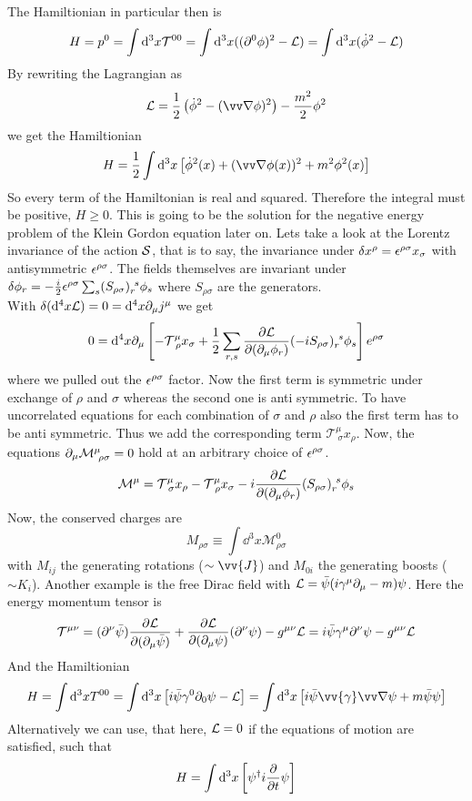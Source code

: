 The Hamiltionian in particular then is
\[ H = p ^0 = \int {\rm d}^3 x \mathcal{T}^{00} = \int {\rm d}^3 x ( (\partial^0 \phi)^2 - \mathcal{L} ) = \int {\rm d}^3 x ( \dot{\phi}^2 - \mathcal{L})\]
By rewriting the Lagrangian as
\[ \LL = \frac{1}{2} \left( \dot{\phi}^2 - ( \vn \phi)^2 \right) - \frac{m^2}{2} \phi^2\]
we get the Hamiltionian
\[ H = \frac{1}{2} \int \dd ^3 x \left[ \dot{\phi}^2(x) + ( \vn \phi(x))^2 + m^2 \phi^2(x) \right]\]
So every term of the Hamiltonian is real and squared. Therefore the integral must be positive, $H \geq 0$. This is going to be the solution for the negative energy problem of the Klein Gordon equation later on.
Lets take a look at the Lorentz invariance of the action $\mathcal{S}$, that is to say, the invariance under $ \delta x^\rho = \epsilon^{\rho \sigma}x_\sigma$ with antisymmetric $\epsilon^{\rho\sigma}$. The fields themselves are invariant under $\delta \phi_r = - \frac{i}{2} \epsilon^{\rho \sigma} \sum_s (S_{\rho\sigma})_r^{~s}\phi_s$ where $S_{\rho\sigma}$ are the generators.\\
With $\delta({\rm d}^4 x \mathcal{L}) = 0 = {\rm d}^4 x \partial_\mu j^\mu$ we get
\[ 0 = {\rm d}^4 x \partial_\mu \left[ - \mathcal{T}^\mu_{~\rho} x_\sigma + \frac{1}{2} \sum_{r,s} \frac{\partial \mathcal{L}}{\partial( \partial_\mu \phi_r)} (-i S_{\rho \sigma})_r^{~s}\phi_s\right] e^{\rho \sigma}\]
where we pulled out the $\epsilon^{\rho\sigma}$ factor. Now the first term is symmetric under exchange of $\rho$ and $\sigma$ whereas the second one is anti symmetric. To have uncorrelated equations for each combination of $\sigma$ and $\rho$ also the first term has to be anti symmetric. Thus we add the corresponding term $\mathcal{T}^{\mu}_{~\sigma}x_\rho$. Now, the equations $\partial_\mu \mathcal{M}^\mu_{~\rho\sigma} =0$ hold at an arbitrary choice of $\epsilon^{\rho\sigma}$.
\[\mathcal{M}^\mu = \mathcal{T}^\mu_{~\sigma} x_\rho - \mathcal{T}^\mu_{~\rho}x_\sigma - i \frac{\partial \mathcal{L}}{\partial ( \partial _\mu \phi_r)} ( S_{\rho\sigma})_r^{~s}\phi_s\]
Now, the conserved charges are
\[ M_{\rho \sigma} \equiv \int \dd^3 x \mathcal{M}^0_{\rho\sigma}\]
with $M_{ij}$ the generating rotations ($\sim \vv{J}$) and $M_{0i}$ the generating boosts ($\sim K_i$).
Another example is the free Dirac field with $\mathcal{L} = \bar{\psi}( i \gamma^\mu \partial_ \mu - m ) \psi$. Here the energy momentum tensor is
\[ \mathcal{T}^{\mu \nu} = (\partial^\nu \bar{\psi}) \frac{\partial \mathcal{L}}{\partial ( \partial_\mu \bar{\psi})} + \frac{\partial \mathcal{L}}{\partial ( \partial_\mu \psi)} ( \partial^\nu \psi) - g^{\mu\nu} \mathcal{L} = i \bar{\psi} \gamma^\mu \partial ^\nu \psi - g^{\mu\nu} \mathcal{L}\]
And the Hamiltionian
\[ H = \int \dd^3 x T^{00} = \int \dd^3 x \left[ i \bar{\psi} \gamma^0 \p_0 \psi - \LL\right] = \int \dd^3 x \left[ i \bar{\psi}\vv{\gamma} \vn \psi + m \bar{\psi} \psi \right]\]
Alternatively we can use, that here, $\mathcal{L} = 0$ if the equations of motion are satisfied, such that 
\[ H = \int {\rm d}^3 x \left[ \psi^\dagger i \frac{\partial}{\partial t} \psi \right]\]
